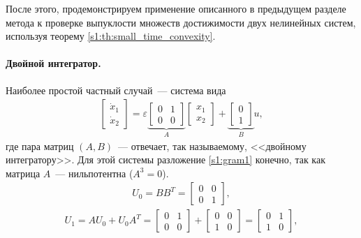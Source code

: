 \documentclass[../main.tex]{subfiles}
\begin{document}
После этого, продемонстрируем применение описанного в предыдущем разделе метода к проверке выпуклости множеств достижимости двух нелинейных систем, используя теорему \ref{s1:th:small_time_convexity}.

\paragraph{Двойной интегратор.}
Наиболее простой частный случай~--- система вида 
\begin{gather*}
    \left[ {\begin{array}{*{20}{c}}
            {{{\dot x}_1}}\\
            {{{\dot x}_2}}
    \end{array}} \right] = \varepsilon \underbrace {\left[ {\begin{array}{*{20}{c}}
                 0&1\\
                 0&0
         \end{array}} \right]}_A\left[ {\begin{array}{*{20}{c}}
             {{x_1}}\\
             {{x_2}}
     \end{array}} \right] + \underbrace {\left[ {\begin{array}{*{20}{c}}
                 0\\
                 1
         \end{array}} \right]}_Bu,
\end{gather*}
где пара матриц $ (A,B) $~--- отвечает, так называемому, <<двойному интегратору>>.
Для этой системы разложение \eqref{s1:gram1} конечно, так как матрица $ A $~--- нильпотентна ($ A^3 = 0$).
\begin{gather*}
    U_0 = B B^T =  \left[ {\begin{array}{*{20}{c}}
             0&0\\
             0&1
     \end{array}}\right],
\end{gather*}
\begin{gather*}
     U_1 = A U_0 + U_0 A^T = \left[ {\begin{array}{*{20}{c}}
             0&1\\
             0&0
     \end{array}}\right] + \left[ {\begin{array}{*{20}{c}}
             0&0\\
             1&0
     \end{array}}\right] = \left[ {\begin{array}{*{20}{c}}
             0&1\\
             1&0
     \end{array}}\right],
\end{gather*}
\end{document}

